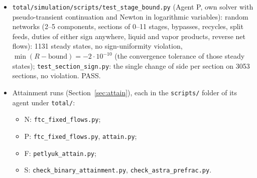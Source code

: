 \begin{itemize}
permissive point (40 digits).
\item \texttt{total/simulation/scripts/test\_stage\_bound.py} (Agent P, own solver with pseudo-transient continuation
and Newton in logarithmic variables): random networks (2--5 components, sections of 0--11 stages, bypasses, recycles,
split feeds, duties of either sign anywhere, liquid and vapor products, reverse net flows): 1131 steady states, no
sign-uniformity violation, $\min(R-\text{bound})=-2\cdot10^{-10}$ (the convergence tolerance of those steady states);
\texttt{test\_section\_sign.py}: the single change of side per section on 3053 sections, no violation. PASS.
\item Attainment runs (Section~\ref{sec:attain}), each in the \texttt{scripts/} folder of its agent under
\texttt{total/}:
\begin{itemize}
\item N: \texttt{ftc\_fixed\_flows.py};
\item P: \texttt{ftc\_fixed\_flows.py}, \texttt{attain.py};
\item F: \texttt{petlyuk\_attain.py};
\item S: \texttt{check\_binary\_attainment.py}, \texttt{check\_astra\_prefrac.py}.
\end{itemize}
\end{itemize}

